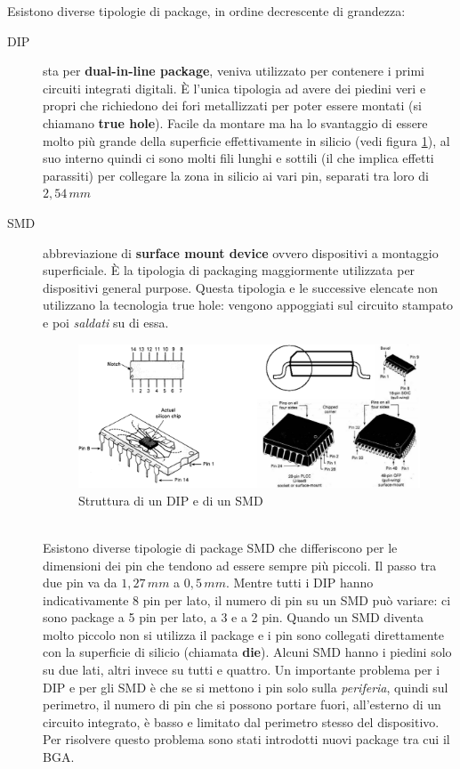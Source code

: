 \documentclass[12pt, a4paper]{report}
\begin{document}
Esistono diverse tipologie di package, in ordine decrescente di grandezza:
\begin{description}
    \item[DIP] sta per \textbf{dual-in-line package}, veniva utilizzato per contenere i primi circuiti integrati digitali. È l'unica tipologia ad avere dei piedini veri e propri che richiedono dei fori metallizzati per poter essere montati (si chiamano \textbf{true hole}). Facile da montare ma ha lo svantaggio di essere molto più grande della superficie effettivamente in silicio (vedi figura \ref{dip_smd}), al suo interno quindi ci sono molti fili lunghi e sottili (il che implica effetti parassiti) per collegare la zona in silicio ai vari pin, separati tra loro di $2,54\,mm$
    \item[SMD] abbreviazione di \textbf{surface mount device} ovvero dispositivi a montaggio superficiale. È la tipologia di packaging maggiormente utilizzata per dispositivi general purpose. Questa tipologia e le successive elencate non utilizzano la tecnologia true hole: vengono appoggiati sul circuito stampato e poi \textit{saldati} su di essa.
    \begin{figure}[h]
        \centering
        \includegraphics[scale=0.3,angle=0]{dip_smd.png}
        \caption{Struttura di un DIP e di un SMD}
        \label{dip_smd}
    \end{figure}
    \\Esistono diverse tipologie di package SMD che differiscono per le dimensioni dei pin che tendono ad essere sempre più piccoli. Il passo tra due pin va da $1,27\,mm$ a $0,5\,mm$. Mentre tutti i DIP hanno indicativamente 8 pin per lato, il numero di pin su un SMD può variare: ci sono package a 5 pin per lato, a 3 e a 2 pin. Quando un SMD diventa molto piccolo non si utilizza il package e i pin sono collegati direttamente con la superficie di silicio (chiamata \textbf{die}). Alcuni SMD hanno i piedini solo su due lati, altri invece su tutti e quattro. Un importante problema per i DIP e per gli SMD è che se si mettono i pin solo sulla \textit{periferia}, quindi sul perimetro, il numero di pin che si possono portare fuori, all'esterno di un circuito integrato, è basso e limitato dal perimetro stesso del dispositivo. Per risolvere questo problema sono stati introdotti nuovi package tra cui il BGA.

\end{description}
\end{document}
